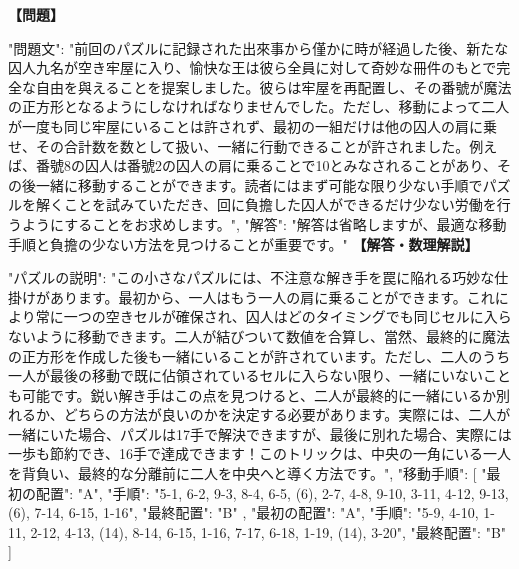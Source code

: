 \documentclass[10pt,a4paper,oneside,openany]{ltjsbook}
\begin{document}
\begin{tcolorbox}[colback=softblue,colframe=primaryblue,title=\textbf{第 402 問：NINE JOLLY GAOL BIRDS.},arc=2mm,boxrule=1pt,breakable]
\textbf{【問題】}\par\vspace{0.3em}
{
"問題文": "前回のパズルに記録された出來事から僅かに時が経過した後、新たな囚人九名が空き牢屋に入り、愉快な王は彼ら全員に対して奇妙な冊件のもとで完全な自由を與えることを提案しました。彼らは牢屋を再配置し、その番號が魔法の正方形となるようにしなければなりませんでした。ただし、移動によって二人が一度も同じ牢屋にいることは許されず、最初の一組だけは他の囚人の肩に乗せ、その合計数を数として扱い、一緒に行動できることが許されました。例えば、番號8の囚人は番號2の囚人の肩に乗ることで10とみなされることがあり、その後一緒に移動することができます。読者にはまず可能な限り少ない手順でパズルを解くことを試みていただき、回に負擔した囚人ができるだけ少ない労働を行うようにすることをお求めします。",
"解答": "解答は省略しますが、最適な移動手順と負擔の少ない方法を見つけることが重要です。"
}
\tcblower
\textbf{【解答・数理解説】}\par\vspace{0.3em}
{
  "パズルの説明": "この小さなパズルには、不注意な解き手を罠に陥れる巧妙な仕掛けがあります。最初から、一人はもう一人の肩に乗ることができます。これにより常に一つの空きセルが確保され、囚人はどのタイミングでも同じセルに入らないように移動できます。二人が結びついて数値を合算し、當然、最終的に魔法の正方形を作成した後も一緒にいることが許されています。ただし、二人のうち一人が最後の移動で既に佔領されているセルに入らない限り、一緒にいないことも可能です。鋭い解き手はこの点を見つけると、二人が最終的に一緒にいるか別れるか、どちらの方法が良いのかを決定する必要があります。実際には、二人が一緒にいた場合、パズルは17手で解決できますが、最後に別れた場合、実際には一歩も節約でき、16手で達成できます！このトリックは、中央の一角にいる一人を背負い、最終的な分離前に二人を中央へと導く方法です。",
  "移動手順": [
    {
      "最初の配置": "A",
      "手順": "5-1, 6-2, 9-3, 8-4, 6-5, (6), 2-7, 4-8, 9-10, 3-11, 4-12, 9-13, (6), 7-14, 6-15, 1-16",
      "最終配置": "B"
    },
    {
      "最初の配置": "A",
      "手順": "5-9, 4-10, 1-11, 2-12, 4-13, (14), 8-14, 6-15, 1-16, 7-17, 6-18, 1-19, (14), 3-20",
      "最終配置": "B"
    }
  ]
}
\end{tcolorbox}
\end{document}
